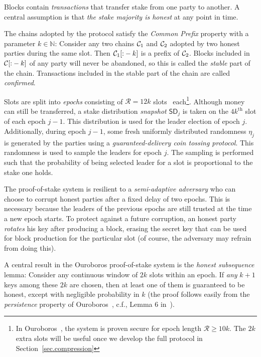 Blocks contain \emph{transactions} that transfer stake from one party to another.
A central assumption is that \emph{the stake majority is honest} at any point in
time.

The chains adopted by the protocol satisfy the \emph{Common Prefix} property
with a parameter $k \in \mathbb{N}$:
Consider any two chains $\mathcal{C}_1$ and $\mathcal{C}_2$ adopted by two honest parties
during the same slot. Then $\mathcal{C}_1[{:}-k]$ is a prefix of $\mathcal{C}_2$.
Blocks included in $\mathcal{C}[{:}-k]$ of any party will never be abandoned,
so this is called the \emph{stable} part of the chain. Transactions included
in the stable part of the chain are called \emph{confirmed}.

Slots are split into \emph{epochs} consisting of $\mathcal{R} = 12k$
slots~\cite{pos-sidechains} each\footnote{In Ouroboros~\cite{ouroboros},
the system is proven secure for epoch length $\mathcal{R} \geq 10k$.
The $2k$ extra slots will
be useful once we develop the full protocol in Section~\ref{sec.compression}}.
Although money can still be transferred, a stake distribution \emph{snapshot} $\textsf{SD}_j$
is taken on the $4k^\text{th}$ slot of each epoch $j-1$. This distribution is
used for the leader election of epoch $j$. Additionally, during epoch $j-1$, some fresh
uniformly distributed randomness $\eta_j$ is generated by the parties using a \emph{guaranteed-delivery
coin tossing protocol}. This randomness is used to sample the leaders for epoch
$j$. The sampling is performed such that the probability of being selected leader
for a slot is proportional to the stake one holds.

The proof-of-stake system is resilient to a \emph{semi-adaptive adversary} who can
choose to corrupt honest parties after a fixed delay of two epochs. This is necessary
because the leaders of the previous epochs are still trusted at the time a new epoch
starts. To protect against a future corruption, an honest party \emph{rotates} his
key after producing a block, erasing the secret key that can be used for block
production for the particular slot (of course, the adversary may refrain from doing
this).

A central result in the Ouroboros proof-of-stake system is the \emph{honest subsequence}
lemma: Consider any continuous window of $2k$ slots within an epoch. If \emph{any}
$k+1$ keys among these $2k$ are chosen, then at least one of them is guaranteed to
be honest, except with negligible probability in $k$
(the proof follows easily from the \emph{persistence} property of
Ouroboros~\cite{ouroboros}, c.f., Lemma $6$ in~\cite{pos-sidechains}).

